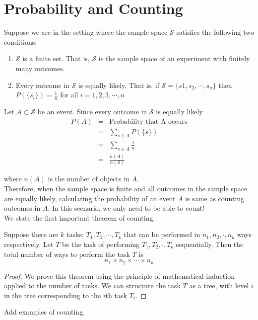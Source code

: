 \section[Probability and Counting]{Probability and Counting}
Suppose we are in the setting where the sample space $\mathcal{S}$ satisfies the following two conditions:
\begin{enumerate}
\item $\mathcal{S}$ is a finite set. That is, $\mathcal{S}$ is the sample space of an experiment with finitely many outcomes.
\item Every outcome in $\mathcal{S}$ is equally likely. That is, if $\mathcal{S}=\{s1,s_2,\cdots,s_n\}$ then $P(\{s_i\})=\frac{1}{n}$ for all $i=1,2,3,\cdots,n$
\end{enumerate}
Let $A\subset \mathcal{S}$ be an event. Since every outcome in $\mathcal{S}$ is equally likely 
\begin{eqnarray*}
P(A)&=&\text{Probability that A occurs}\\
&=& \sum_{s\in A} P(\{s\})\\
&=& \sum_{s\in A} \frac{1}{n}\\
&=& \frac{n(A)}{n(S)}
\end{eqnarray*}

where $n(A)$ is the number of objects in $A$. 
\\
Therefore, when the sample space is finite and all outcomes in the sample space are equally likely, calculating the probability of an event $A$ is same as counting outcomes in $A$. In this scenario, we only need to be able to count! 
\\

We state the first important theorem of counting. 
\begin{thm}
 Suppose there are $k$ tasks: $T_1,T_2,\cdots,T_k$ that can be performed in $n_1,n_2,\cdot,n_k$ ways respectively. Let $T$ be the task of performing $T_1,T_2,\cdot,T_k$ sequentially. Then the total number of ways to perform the task $T$ is 
 $$n_1\times n_2 \times \cdots \times n_k$$ 
\end{thm} 

\begin{proof}
    We prove this theorem using the principle of mathematical induction applied to the number of tasks. We can structure the task $T$ as a tree, with level $i$ in the tree corresponding to the $i$th task $T_i$. 
\end{proof}

\begin{ex}
    Add examples of counting. 
\end{ex}

